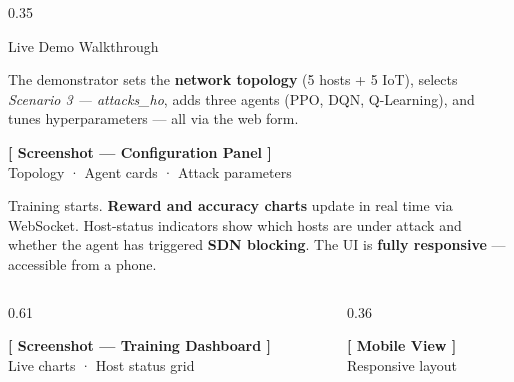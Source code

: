 \documentclass[final]{beamer}
\begin{document}
\begin{frame}[t]
\begin{columns}[T,totalwidth=\textwidth]
\begin{column}{0.35\textwidth}
\begin{block}{Live Demo Walkthrough}
\vspace{0.55cm}

\begin{tcolorbox}[demobox,
  title={\large\raisebox{1pt}{\textbf{\textsf{②}}}~Configuration}]
\large
The demonstrator sets the \textbf{network topology}
(5 hosts + 5 IoT), selects \emph{Scenario 3 — attacks\_ho},
adds three agents (PPO, DQN, Q-Learning), and tunes
hyperparameters — all via the web form.

\vspace{0.5cm}
\begin{tcolorbox}[screenshot, height=9cm]
\textbf{[ Screenshot — Configuration Panel ]}\\[4pt]
Topology · Agent cards · Attack parameters
\end{tcolorbox}
\end{tcolorbox}

\vspace{0.55cm}

\begin{tcolorbox}[demobox,
  title={\large\raisebox{1pt}{\textbf{\textsf{③}}}~Experiment \textnormal{(also on mobile)}}]
\large
Training starts. \textbf{Reward and accuracy charts} update in
real time via WebSocket. Host-status indicators show
which hosts are under attack and whether the agent has
triggered \textbf{\color{cred}SDN blocking}.
The UI is \textbf{fully responsive} — accessible from a phone.

\vspace{0.4cm}
\begin{columns}[T]
  \begin{column}{0.61\textwidth}
    \begin{tcolorbox}[screenshot, height=12cm]
      \textbf{[ Screenshot — Training Dashboard ]}\\[4pt]
      Live charts · Host status grid
    \end{tcolorbox}
  \end{column}
  \hfill
  \begin{column}{0.36\textwidth}
    \begin{tcolorbox}[screenshot, height=12cm]
      \textbf{[ Mobile View ]}\\[4pt]
      Responsive layout
    \end{tcolorbox}
  \end{column}
\end{columns}
\end{tcolorbox}

\vspace{0.55cm}


\end{block}
\end{column}
\end{columns}
\end{frame}
\end{document}
